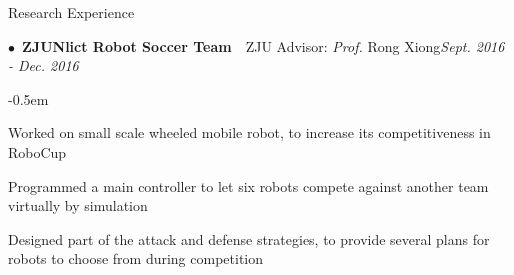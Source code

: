 \documentclass{resume} %
\begin{document}
\begin{rSection}{Research Experience}

\begin{spacing}{0.4}
$\bullet$~{\bf ZJUNlict Robot Soccer Team}~~{ZJU Advisor: {\em Prof.} Rong Xiong}\hfill{\em Sept. 2016 - Dec. 2016}\smallskip\\
\end{spacing}
\begin{list}{--}{\leftmargin=1em}
	\itemsep -0.5em \vspace{-0.5em}
\item Worked on small scale wheeled mobile robot, to increase its competitiveness in RoboCup
\item Programmed a main controller to let six robots compete against another team virtually by simulation
\item Designed part of the attack and defense strategies, to provide several plans for robots to choose from during competition

\end{list}




\end{rSection}
\end{document}
